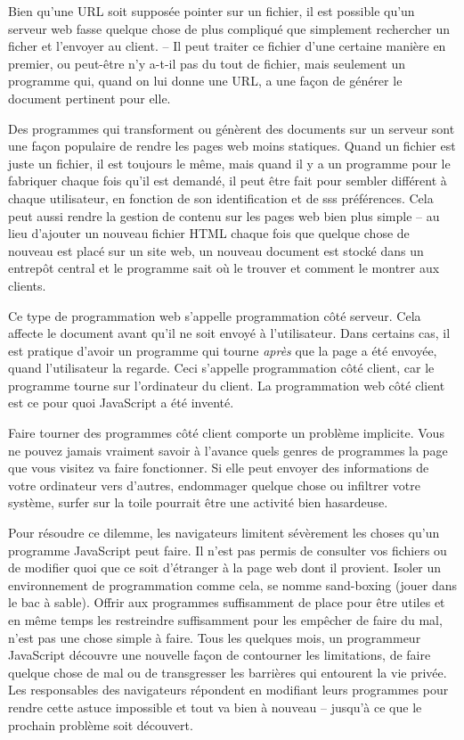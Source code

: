 \documentclass{FramateX}
\begin{document}
\begin{center}\end{center}

Bien qu'une URL soit supposée pointer sur un fichier, il est possible
qu'un serveur web fasse quelque chose de plus compliqué que simplement
rechercher un ficher et l'envoyer au client. -- Il peut traiter ce
fichier d'une certaine manière en premier, ou peut-être n'y a-t-il pas
du tout de fichier, mais seulement un programme qui, quand on lui donne
une URL, a une façon de générer le document pertinent pour elle.

Des programmes qui transforment ou génèrent des documents sur un serveur
sont une façon populaire de rendre les pages web moins statiques. Quand
un fichier est juste un fichier, il est toujours le même, mais quand il
y a un programme pour le fabriquer chaque fois qu'il est demandé, il
peut être fait pour sembler différent à chaque utilisateur, en fonction
de son identification et de sss préférences. Cela peut aussi rendre la
gestion de contenu sur les pages web bien plus simple -- au lieu
d'ajouter un nouveau fichier HTML chaque fois que quelque chose de
nouveau est placé sur un site web, un nouveau document est stocké dans
un entrepôt central et le programme sait où le trouver et comment le
montrer aux clients.

Ce type de programmation web s'appelle programmation côté serveur. Cela
affecte le document avant qu'il ne soit envoyé à l'utilisateur. Dans
certains cas, il est pratique d'avoir un programme qui tourne
\emph{après} que la page a été envoyée, quand l'utilisateur la regarde.
Ceci s'appelle programmation côté client, car le programme tourne sur
l'ordinateur du client. La programmation web côté client est ce pour
quoi JavaScript a été inventé.

\begin{center}\end{center}

Faire tourner des programmes côté client comporte un problème implicite.
Vous ne pouvez jamais vraiment savoir à l'avance quels genres de
programmes la page que vous visitez va faire fonctionner. Si elle peut
envoyer des informations de votre ordinateur vers d'autres, endommager
quelque chose ou infiltrer votre système, surfer sur la toile pourrait
être une activité bien hasardeuse.

Pour résoudre ce dilemme, les navigateurs limitent sévèrement les choses
qu'un programme JavaScript peut faire. Il n'est pas permis de consulter
vos fichiers ou de modifier quoi que ce soit d'étranger à la page web
dont il provient. Isoler un environnement de programmation comme cela,
se nomme sand-boxing (jouer dans le bac à sable). Offrir aux programmes
suffisamment de place pour être utiles et en même temps les restreindre
suffisamment pour les empêcher de faire du mal, n'est pas une chose
simple à faire. Tous les quelques mois, un programmeur JavaScript
découvre une nouvelle façon de contourner les limitations, de faire
quelque chose de mal ou de transgresser les barrières qui entourent la
vie privée. Les responsables des navigateurs répondent en modifiant
leurs programmes pour rendre cette astuce impossible et tout va bien à
nouveau -- jusqu'à ce que le prochain problème soit découvert.
\end{document}
